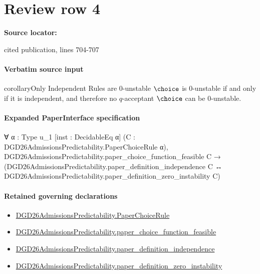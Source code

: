 \documentclass[10pt]{article}
\begin{document}
\section*{Review row 4}
\textbf{Source locator:} {\footnotesize\raggedright cited publication, lines 704-\allowbreak{}707\par}
\paragraph{Verbatim source input}
\begin{ReviewVerbatim}
\begin{restatable}{corollary}{Only Independent Rules are 0-unstable}
\label{thm:independent-zero-unstable}
$\choice$ is $0$-unstable if and only if it is independent, and therefore no $q$-acceptant $\choice$ can be $0$-unstable.
\end{restatable}
\end{ReviewVerbatim}



\paragraph{Expanded PaperInterface specification}
\begin{ReviewVerbatim}
∀ {α : Type u_1} [inst : DecidableEq α] (C : DGD26AdmissionsPredictability.PaperChoiceRule α),
  DGD26AdmissionsPredictability.paper_choice_function_feasible C →
    (DGD26AdmissionsPredictability.paper_definition_independence C ↔
      DGD26AdmissionsPredictability.paper_definition_zero_instability C)
\end{ReviewVerbatim}

\paragraph{Retained governing declarations}
\begin{itemize}\raggedright
\item \hyperlink{governing-declaration-4678951b4432b184}{DGD26\allowbreak{}Admissions\allowbreak{}Predictability.\allowbreak{}Paper\allowbreak{}Choice\allowbreak{}Rule}
\item \hyperlink{governing-declaration-f7de74a44053f6d5}{DGD26\allowbreak{}Admissions\allowbreak{}Predictability.\allowbreak{}paper\_\allowbreak{}choice\_\allowbreak{}function\_\allowbreak{}feasible}
\item \hyperlink{governing-declaration-707bee77009ecc4d}{DGD26\allowbreak{}Admissions\allowbreak{}Predictability.\allowbreak{}paper\_\allowbreak{}definition\_\allowbreak{}independence}
\item \hyperlink{governing-declaration-c23ecf0aa84721c4}{DGD26\allowbreak{}Admissions\allowbreak{}Predictability.\allowbreak{}paper\_\allowbreak{}definition\_\allowbreak{}zero\_\allowbreak{}instability}
\end{itemize}
\end{document}
